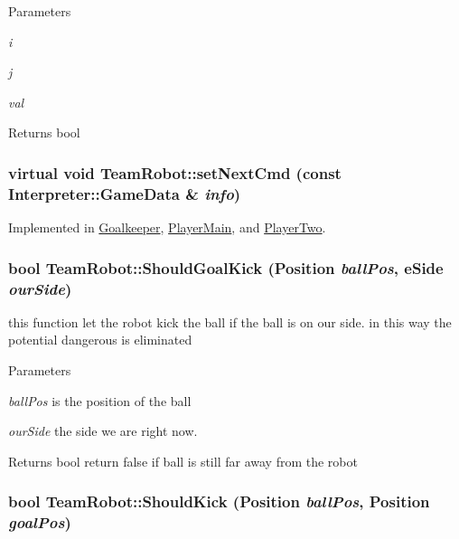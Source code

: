 \begin{DoxyParams}{Parameters}
\item[{\em i}]\item[{\em j}]\item[{\em val}]\end{DoxyParams}
\begin{DoxyReturn}{Returns}
bool 
\end{DoxyReturn}
\hypertarget{classTeamRobot_a65f9a2b7464dfac3f4a0336810cf574f}{
\subsubsection[{setNextCmd}]{\setlength{\rightskip}{0pt plus 5cm}virtual void TeamRobot::setNextCmd (const {\bf Interpreter::GameData} \& {\em info})}}
\label{classTeamRobot_a65f9a2b7464dfac3f4a0336810cf574f}


Implemented in \hyperlink{classGoalkeeper_abc394351f7c0d552c6e96da422c772ec}{Goalkeeper}, \hyperlink{classPlayerMain_a8f0320189df15529662c7f16d2f74084}{PlayerMain}, and \hyperlink{classPlayerTwo_a7ac9a9a4f1dedee2006e6a0c79f37c0c}{PlayerTwo}.

\hypertarget{classTeamRobot_ae7f6fa303c865dad297b662731165883}{
\subsubsection[{ShouldGoalKick}]{\setlength{\rightskip}{0pt plus 5cm}bool TeamRobot::ShouldGoalKick (Position {\em ballPos}, \/  eSide {\em ourSide})}}
\label{classTeamRobot_ae7f6fa303c865dad297b662731165883}


this function let the robot kick the ball if the ball is on our side. in this way the potential dangerous is eliminated 


\begin{DoxyParams}{Parameters}
\item[{\em ballPos}]is the position of the ball \item[{\em ourSide}]the side we are right now. \end{DoxyParams}
\begin{DoxyReturn}{Returns}
bool return false if ball is still far away from the robot 
\end{DoxyReturn}
\hypertarget{classTeamRobot_ac979572f4899940e88f067102ac1ae46}{
\subsubsection[{ShouldKick}]{\setlength{\rightskip}{0pt plus 5cm}bool TeamRobot::ShouldKick (Position {\em ballPos}, \/  Position {\em goalPos})}}
\label{classTeamRobot_ac979572f4899940e88f067102ac1ae46}


